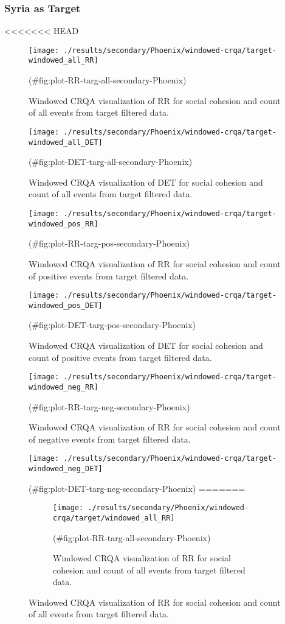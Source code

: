 \begin{appendix}
\hypertarget{syria-as-target}{%
\subsubsection{Syria as Target}\label{syria-as-target}}

<<<<<<< HEAD
\begin{figure}
\texttt{[image: ./results/secondary/Phoenix/windowed-crqa/target-windowed\_all\_RR]} \caption{Windowed CRQA visualization of RR for social cohesion and count of all events from target filtered data.}(\#fig:plot-RR-targ-all-secondary-Phoenix)
\end{figure}

\begin{figure}
\texttt{[image: ./results/secondary/Phoenix/windowed-crqa/target-windowed\_all\_DET]} \caption{Windowed CRQA visualization of DET for social cohesion and count of all events from target filtered data.}(\#fig:plot-DET-targ-all-secondary-Phoenix)
\end{figure}

\begin{figure}
\texttt{[image: ./results/secondary/Phoenix/windowed-crqa/target-windowed\_pos\_RR]} \caption{Windowed CRQA visualization of RR for social cohesion and count of positive events from target filtered data.}(\#fig:plot-RR-targ-pos-secondary-Phoenix)
\end{figure}

\begin{figure}
\texttt{[image: ./results/secondary/Phoenix/windowed-crqa/target-windowed\_pos\_DET]} \caption{Windowed CRQA visualization of DET for social cohesion and count of positive events from target filtered data.}(\#fig:plot-DET-targ-pos-secondary-Phoenix)
\end{figure}

\begin{figure}
\texttt{[image: ./results/secondary/Phoenix/windowed-crqa/target-windowed\_neg\_RR]} \caption{Windowed CRQA visualization of RR for social cohesion and count of negative events from target filtered data.}(\#fig:plot-RR-targ-neg-secondary-Phoenix)
\end{figure}

\begin{figure}
\texttt{[image: ./results/secondary/Phoenix/windowed-crqa/target-windowed\_neg\_DET]} \caption{Windowed CRQA visualization of DET for social cohesion and count of negative events from target filtered data.}(\#fig:plot-DET-targ-neg-secondary-Phoenix)
=======
\begin{figure}[!h]
\texttt{[image: ./results/secondary/Phoenix/windowed-crqa/target/windowed\_all\_RR]} \caption{Windowed CRQA visualization of RR for social cohesion and count of all events from target filtered data.}(\#fig:plot-RR-targ-all-secondary-Phoenix)
\end{figure}


\end{figure}
\end{appendix}
